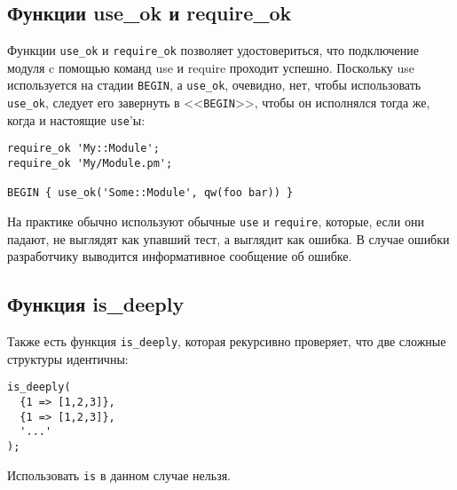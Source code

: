\subsection{Функции use\_ok и require\_ok}
Функции \verb|use_ok| и \verb|require_ok| позволяет удостовериться, что подключение модуля c помощью команд use и require проходит успешно. Поскольку use используется на стадии \verb|BEGIN|, а \verb|use_ok|, очевидно, нет, чтобы использовать \verb|use_ok|, следует его завернуть в <<\verb|BEGIN|>>, чтобы он исполнялся тогда же, когда и настоящие \verb|use|'ы:
\begin{verbatim}
require_ok 'My::Module';
require_ok 'My/Module.pm';

BEGIN { use_ok('Some::Module', qw(foo bar)) }
\end{verbatim}
На практике обычно используют обычные \verb|use| и \verb|require|, которые, если они падают, не выглядят как упавший тест, а выглядит как ошибка. В случае ошибки разработчику выводится информативное сообщение об ошибке.

\subsection{Функция is\_deeply}
Также есть функция \verb|is_deeply|, которая рекурсивно проверяет, что две сложные структуры идентичны:
\begin{verbatim}
is_deeply(
  {1 => [1,2,3]},
  {1 => [1,2,3]},
  '...'
);
\end{verbatim}
Использовать \verb|is| в данном случае нельзя.

